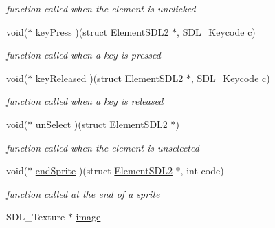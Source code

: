 \begin{DoxyCompactItemize}
\begin{DoxyCompactList}\small\item\em function called when the element is unclicked \end{DoxyCompactList}\item 
void($\ast$ \hyperlink{structElementSDL2_aff1dc935700d44a0ef0d53de7cca9d41}{key\+Press} )(struct \hyperlink{structElementSDL2}{Element\+S\+D\+L2} $\ast$, S\+D\+L\+\_\+\+Keycode c)\hypertarget{structElementSDL2_aff1dc935700d44a0ef0d53de7cca9d41}{}\label{structElementSDL2_aff1dc935700d44a0ef0d53de7cca9d41}

\begin{DoxyCompactList}\small\item\em function called when a key is pressed \end{DoxyCompactList}\item 
void($\ast$ \hyperlink{structElementSDL2_a76ecf85adcb072db772a8351ea7e04ee}{key\+Released} )(struct \hyperlink{structElementSDL2}{Element\+S\+D\+L2} $\ast$, S\+D\+L\+\_\+\+Keycode c)\hypertarget{structElementSDL2_a76ecf85adcb072db772a8351ea7e04ee}{}\label{structElementSDL2_a76ecf85adcb072db772a8351ea7e04ee}

\begin{DoxyCompactList}\small\item\em function called when a key is released \end{DoxyCompactList}\item 
void($\ast$ \hyperlink{structElementSDL2_a8057ee0d19cdd60ec568076206ee0e12}{un\+Select} )(struct \hyperlink{structElementSDL2}{Element\+S\+D\+L2} $\ast$)\hypertarget{structElementSDL2_a8057ee0d19cdd60ec568076206ee0e12}{}\label{structElementSDL2_a8057ee0d19cdd60ec568076206ee0e12}

\begin{DoxyCompactList}\small\item\em function called when the element is unselected \end{DoxyCompactList}\item 
void($\ast$ \hyperlink{structElementSDL2_aa857e06629320966e80bd437050b07e8}{end\+Sprite} )(struct \hyperlink{structElementSDL2}{Element\+S\+D\+L2} $\ast$, int code)\hypertarget{structElementSDL2_aa857e06629320966e80bd437050b07e8}{}\label{structElementSDL2_aa857e06629320966e80bd437050b07e8}

\begin{DoxyCompactList}\small\item\em function called at the end of a sprite \end{DoxyCompactList}\item 
S\+D\+L\+\_\+\+Texture $\ast$ \hyperlink{structElementSDL2_aab2ff0fd3a1c4370d7f1f9cdd250d056}{image}\hypertarget{structElementSDL2_aab2ff0fd3a1c4370d7f1f9cdd250d056}{}\label{structElementSDL2_aab2ff0fd3a1c4370d7f1f9cdd250d056}


\end{DoxyCompactItemize}
